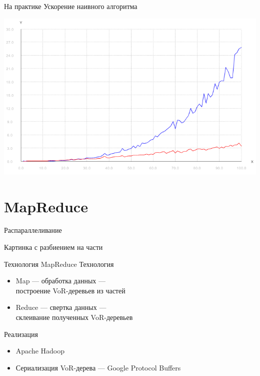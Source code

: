 \documentclass[14pt, fleqn, xcolor={dvipsnames, table}]{beamer}
\begin{document}
        \begin{frame}{На практике}
            Ускорение наивного алгоритма
            \begin{center}
                \includegraphics[scale=0.44]{comparison.png}
            \end{center}           
        \end{frame}
        
    \section{MapReduce}
    
        \begin{frame}{Распараллеливание}
            \begin{center}
                Картинка с разбиением на части
            \end{center}
        \end{frame}
        
        \begin{frame}{Технология MapReduce}
            Технология
            \begin{itemize}
                \item Map --- обработка данных --- \\ построение VoR-деревьев из частей 
                \item Reduce --- свертка данных --- \\ склеивание полученных VoR-деревьев
            \end{itemize} 
            Реализация
            \begin{itemize}
                \item Apache Hadoop
                \item Сериализация VoR-дерева --- Google Protocol Buffers
            \end{itemize}              
        \end{frame}
        
\end{document}

